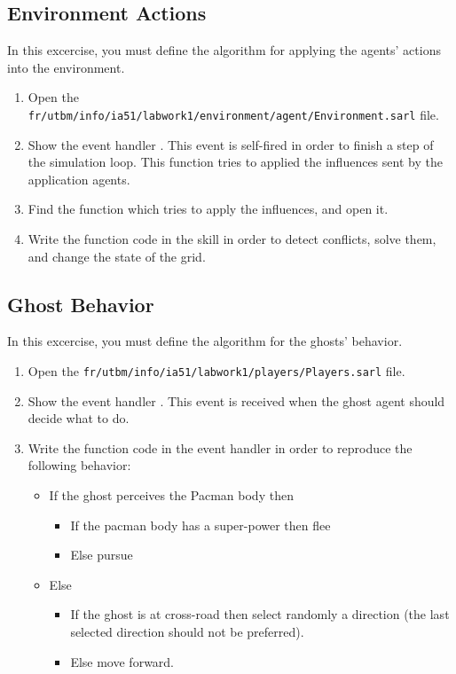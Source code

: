 \documentclass[article,english,nodocumentinfo]{multiagentfrreport}
\begin{document}
\subsection{Environment Actions}

In this excercise, you must define the algorithm for applying the agents' actions into the environment.
\begin{enumerate}
\item Open the \texttt{fr/utbm/info/ia51/labwork1/environment/agent/Environment.sarl} file.
\item Show the event handler . This event is self-fired in order to finish a step of the simulation loop. This function tries to applied the influences sent by the application agents.
\item Find the function which tries to apply the influences, and open it.
\item Write the function code in the skill in order to detect conflicts, solve them, and change the state of the grid.
\end{enumerate}

\subsection{Ghost Behavior}

In this excercise, you must define the algorithm for the ghosts' behavior.
\begin{enumerate}
\item Open the \texttt{fr/utbm/info/ia51/labwork1/players/Players.sarl} file.
\item Show the event handler . This event is received when the ghost agent should decide what to do.
\item Write the function code in the event handler in order to reproduce the following behavior:
	\begin{itemize}
	\item If the ghost perceives the Pacman body then
		\begin{itemize}
		\item If the pacman body has a super-power then flee
		\item Else pursue
		\end{itemize}
	\item Else
		\begin{itemize}
		\item If the ghost is at cross-road then select randomly a direction (the last selected direction should not be preferred).
		\item Else move forward.
		\end{itemize}
	\end{itemize}
\end{enumerate}
\end{document}

